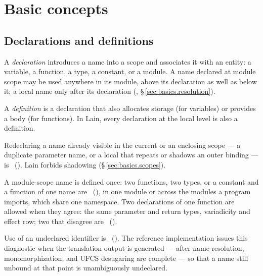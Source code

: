 \chapter{Basic concepts}
\label{sec:06-basics}

\section{Declarations and definitions}
\label{sec:basics.declarations}

\pnum
A \textit{declaration} introduces a name into a scope and associates it with
an entity: a variable, a function, a type, a constant, or a module.  A name declared at
module scope may be used anywhere in its module, above its declaration as well as below
it; a local name only after its declaration (, \S\,\ref{sec:basics.resolution}).

\pnum
A \textit{definition} is a declaration that also allocates storage (for
variables) or provides a body (for functions).  In Lain,
every declaration at the local level is also a definition.

\begin{constraint}
  Redeclaring a name already visible in the current or an enclosing scope
  --- a duplicate parameter name, or a local that repeats or shadows an
  outer binding --- is \illformed{}~().  Lain forbids
  shadowing (\S\,\ref{sec:basics.scopes}).
\end{constraint}

\begin{constraint}
  A module-scope name is defined once: two functions, two types, or a
  constant and a function of one name are \illformed{}~(),
  in one module or across the modules a program imports, which share one
  namespace.  Two  declarations of one function are allowed
  when they agree: the same parameter and return types, variadicity and
  effect row; two that disagree are \illformed{}~().
\end{constraint}

\begin{constraint}
  Use of an undeclared identifier is \illformed{}~().  The
  reference implementation issues this diagnostic when the translation output is
  generated --- after name resolution, monomorphization, and UFCS desugaring are
  complete --- so that a name still unbound at that point is unambiguously
  undeclared.
\end{constraint}

